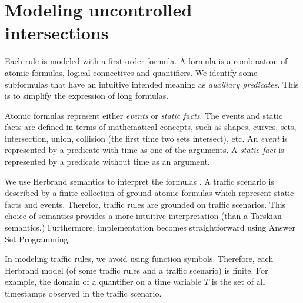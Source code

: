 \section{Modeling uncontrolled intersections}
\label{sec:modeling_uncontrolled}
Each rule is modeled with a first-order formula.
A formula is a combination of atomic formulas,
logical connectives and quantifiers.
We identify some subformulas 
that have an intuitive intended meaning
as \emph{auxiliary predicates}.
This is to simplify the expression of long formulas.

Atomic formulas represent either \emph{events} or \emph{static facts}.
The events and static facts are defined in terms of mathematical concepts,
such as shapes, curves, sets, intersection, union, collision (the first time two sets intersect), etc.
An \emph{event} is represented by a predicate with time as one of the arguments.
A \emph{static fact} is represented by a predicate without time as an argument.

We use Herbrand semantics to interpret the formulas \cite{Herbrand.2019}.
A traffic scenario is described by
a finite collection of ground atomic formulas which
represent static facts and events.
Therefor, traffic rules are grounded on traffic scenarios.
This choice of semantics provides
a more intuitive interpretation (than a Tarskian semantics.)
Furthermore,
implementation becomes straightforward using Answer Set Programming.

In modeling traffic rules,
we avoid using function symbols.
Therefore,
each Herbrand model (of some traffic rules and a traffic scenario) is finite.
For example,
the domain of a quantifier on a time variable $T$ is
the set of all timestamps observed in the traffic scenario.






